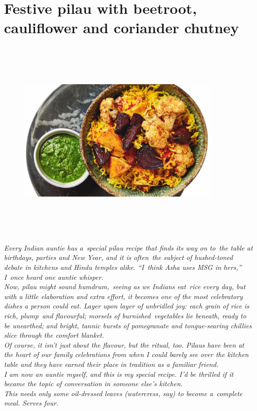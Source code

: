 \documentclass{book}
\begin{document}
\section{Festive pilau with beetroot, cauliflower and coriander chutney}
\begin{figure}
\centering\includegraphics[width=10cm,height=10cm,keepaspectratio]{Recipe_Pictures/Festive_pilau_with_beetroot,_cauliflower_and_coriander_chutney.png}
\end{figure}
\emph{Every Indian auntie has a special pilau recipe that finds its way on to the table at birthdays, parties and New Year, and it is often the subject of hushed-toned debate in kitchens and Hindu temples alike. “I think Asha uses MSG in hers,” I once heard one auntie whisper.\\ 
Now, pilau might sound humdrum, seeing as we Indians eat rice every day, but with a little elaboration and extra effort, it becomes one of the most celebratory dishes a person could eat. Layer upon layer of unbridled joy: each grain of rice is rich, plump and flavourful; morsels of burnished vegetables lie beneath, ready to be unearthed; and bright, tannic bursts of pomegranate and tongue-searing chillies slice through the comfort blanket.\\ 
Of course, it isn’t just about the flavour, but the ritual, too. Pilaus have been at the heart of our family celebrations from when I could barely see over the kitchen table and they have earned their place in tradition as a familiar friend.\\ 
I am now an auntie myself, and this is my special recipe. I’d be thrilled if it became the topic of conversation in someone else’s kitchen.\\ 
This needs only some oil-dressed leaves (watercress, say) to become a complete meal. Serves four.}\\\\ 
\end{document}

